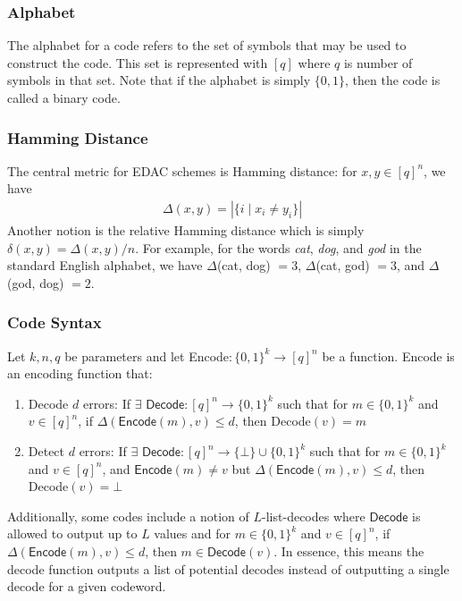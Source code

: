 \documentclass[12pt]{article}%
\begin{document}
\subsubsection{Alphabet}
The alphabet for a code refers to the set of symbols that may be used to construct the code. This set is represented with $[q]$ where $q$ is number of symbols in that set. Note that if the alphabet is simply $\{0, 1\}$, then the code is called a binary code.

\subsubsection{Hamming Distance}
\noindent The central metric for EDAC schemes is Hamming distance: for $x, y \in [q]^n$, we have \begin{align}
    \Delta(x, y) = |\{i \mid x_i \neq y_i\}|
\end{align} Another notion is the relative Hamming distance which is simply $\delta(x, y) = \Delta(x, y) / n$. For example, for the words \textit{cat}, \textit{dog}, and \textit{god} in the standard English alphabet, we have $\Delta$(cat, dog) $ = 3$, $\Delta$(cat, god) $ = 3$, and $\Delta$(god, dog) $ = 2$.  

\subsubsection{Code Syntax}

Let $k, n, q$ be parameters and let \textsf{Encode}$:\{0, 1\}^k \to [q]^n$ be a function. \textsf{Encode} is an encoding function that: \begin{enumerate}
    \item Decode $d$ errors: If $\exists$ $\textsf{Decode}:[q]^n \to \{0, 1\}^k$ such that for $m \in \{0, 1\}^k$ and $v \in [q]^n$, if $\Delta(\textsf{Encode}(m), v) \leq d$, then \textsf{Decode}$(v) = m$
    \item Detect $d$ errors: If $\exists$ $\textsf{Decode}: [q]^n \to \{\bot\} \cup\{0, 1\}^k$ such that for $m \in \{0, 1\}^k$ and $v \in [q]^n$, and $\textsf{Encode}(m) \neq v$ but $\Delta(\textsf{Encode}(m), v) \leq d$, then \textsf{Decode}$(v) = \bot$
\end{enumerate} Additionally, some codes include a notion of $L$-list-decodes where $\textsf{Decode}$ is allowed to output up to $L$ values and for $m \in \{0, 1\}^k$ and $v \in [q]^n$, if $\Delta(\textsf{Encode}(m), v) \leq d$, then $m \in \textsf{Decode}(v)$. In essence, this means the decode function outputs a list of potential decodes instead of outputting a single decode for a given codeword. 
\end{document}
